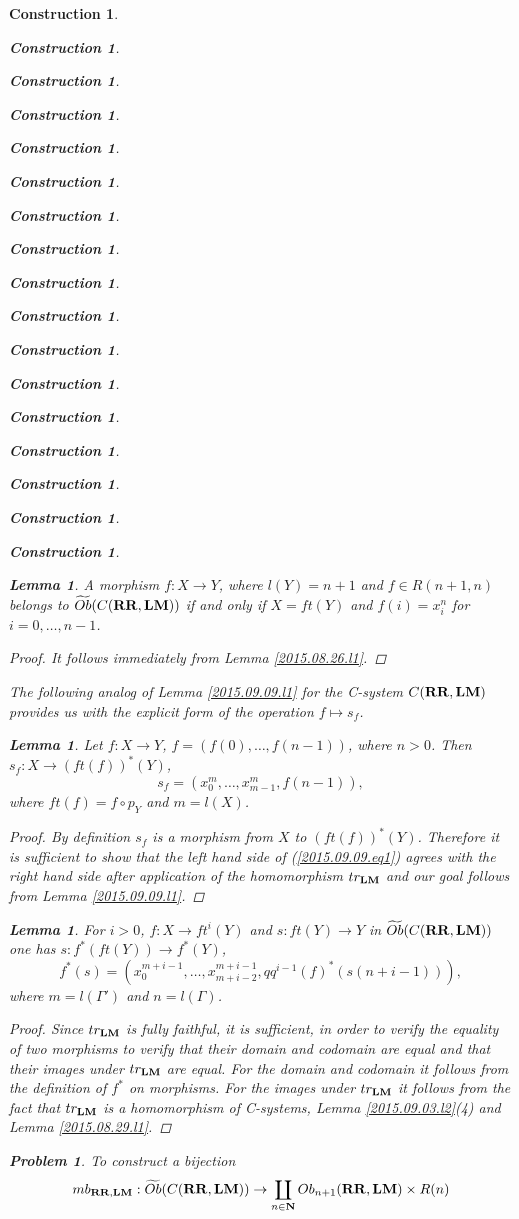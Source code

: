 \documentclass[12pt]{amsart}
\newenvironment{eq}{\begin{equation}}{\end{equation}}
\newtheorem{lemma}[proposition]{Lemma}
\newtheorem{problem}[proposition]{Problem}
\newtheorem{construction}[proposition]{Construction}
\newcommand{\llabel}[1]{\label{#1}}
\newcommand{\sr}{\rightarrow}
\newcommand{\nn}{{\bf N\rm}}
\newcommand{\nat}{\nn}
\newcommand{\wt}{\widetilde}
\newcommand{\mbind}[1]{{#1^*}}
\newcommand{\RR}{{\bf RR}}
\newcommand{\LM}{{\bf LM}}
\begin{document}
\begin{construction}
\begin{construction}
\begin{construction}
\begin{construction}
\begin{construction}
\begin{construction}
\begin{construction}
\begin{construction}
\begin{construction}
\begin{construction}
\begin{construction}
\begin{construction}
\begin{construction}
\begin{construction}
\begin{construction}
\begin{construction}
\begin{construction}
%
\begin{lemma}
\llabel{2015.08.22.l5} A morphism $f:X\sr Y$, where $l(Y)=n+1$ and $f\in
R(n+1,n)$ belongs to $\wt{Ob}(C(\RR,\LM))$ if and only if $X=ft(Y)$ and
$f(i)=x^n_i$ for $i=0,\dots,n-1$.
\end{lemma}
%
\begin{proof}
It follows immediately from Lemma \ref{2015.08.26.l1}.
\end{proof}
%
The following analog of Lemma \ref{2015.09.09.l1} for the C-system $C(\RR,\LM)$
provides us with the explicit form of the operation $f\mapsto s_f$.
%
\begin{lemma}
\llabel{2015.09.09.l2}
Let $f:X\sr Y$, $f=(f(0),\dots,f(n-1))$, where $n>0$. Then $s_f:X\sr (ft(f))^*(Y)$,
%
\begin{eq}\llabel{2015.09.09.eq1}
s_f=(x_0^{m},\dots,x_{m-1}^{m},f(n-1)),
\end{eq}%
%
where $ft(f)=f\circ p_Y$ and $m=l(X)$. 
\end{lemma}
%
\begin{proof}
By definition $s_f$ is a morphism from $X$ to $(ft(f))^*(Y)$. Therefore it is
sufficient to show that the left hand side of (\ref{2015.09.09.eq1}) agrees
with the right hand side after application of the homomorphism $tr_{\LM}$ and
our goal follows from Lemma \ref{2015.09.09.l1}.
\end{proof}
%
\begin{lemma}
\llabel{2015.09.03.l1}
For $i>0$, $f:X\sr ft^i(Y)$ and $s:ft(Y)\sr Y$ in $\wt{Ob}(C(\RR,\LM))$ one has $s:f^*(ft(Y))\sr f^*(Y)$,
%
$$f^*(s)=(x_0^{m+i-1},\dots,x_{m+i-2}^{m+i-1},\mbind{qq^{i-1}(f)}(s(n+i-1))),$$
%
where $m=l(\Gamma')$ and $n=l(\Gamma)$.
\end{lemma}
%
\begin{proof}
Since $tr_{\LM}$ is fully faithful, it is sufficient, in order to verify the
equality of two morphisms to verify that their domain and codomain are equal
and that their images under $tr_{\LM}$ are equal. For the domain and codomain
it follows from the definition of $f^*$ on morphisms. For the images under
$tr_{\LM}$ it follows from the fact that $tr_{\LM}$ is a homomorphism of
C-systems, Lemma \ref{2015.09.03.l2}(4) and Lemma \ref{2015.08.29.l1}.
\end{proof}
%
\begin{problem}
\llabel{2015.08.22.prob1}
To construct a bijection
%
\begin{eq}
\llabel{2009.10.15.eq2}
mb_{\RR,\LM}:\wt{Ob}(C(\RR,\LM))\sr \coprod_{n\in\nat} Ob_{n+1}(\RR,\LM)\times R(n)

\end{eq}
\end{problem}
\end{construction}
\end{construction}
\end{construction}
\end{construction}
\end{construction}
\end{construction}
\end{construction}
\end{construction}
\end{construction}
\end{construction}
\end{construction}
\end{construction}
\end{construction}
\end{construction}
\end{construction}
\end{construction}
\end{construction}
\end{document}
